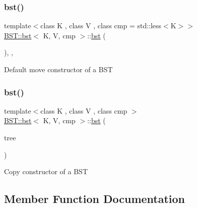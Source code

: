 \subsubsection{\texorpdfstring{bst()}{bst()}\hspace{0.1cm}{\footnotesize\ttfamily [2/3]}}
{\footnotesize\ttfamily template$<$class K , class V , class cmp  = std\+::less$<$\+K$>$$>$ \\
\hyperlink{classBST_1_1bst}{B\+S\+T\+::bst}$<$ K, V, cmp $>$\+::\hyperlink{classBST_1_1bst}{bst} (\begin{DoxyParamCaption}\item[{\hyperlink{classBST_1_1bst}{bst}$<$ K, V, cmp $>$ \&\&}]{ }\end{DoxyParamCaption})\hspace{0.3cm}{\ttfamily [explicit]}, {\ttfamily [default]}, {\ttfamily [noexcept]}}

Default move constructor of a B\+ST \mbox{\label{classBST_1_1bst_ae959ba0709bffaa2617a87813baa2f34}} 
\subsubsection{\texorpdfstring{bst()}{bst()}\hspace{0.1cm}{\footnotesize\ttfamily [3/3]}}
{\footnotesize\ttfamily template$<$class K , class V , class cmp $>$ \\
\hyperlink{classBST_1_1bst}{B\+S\+T\+::bst}$<$ K, V, cmp $>$\+::\hyperlink{classBST_1_1bst}{bst} (\begin{DoxyParamCaption}\item[{const \hyperlink{classBST_1_1bst}{bst}$<$ K, V, cmp $>$ \&}]{tree }\end{DoxyParamCaption})\hspace{0.3cm}{\ttfamily [explicit]}}

Copy constructor of a B\+ST 

\subsection{Member Function Documentation}
\mbox{\label{classBST_1_1bst_aa6e180151029e2da1a960acd0b6959d6}} 
